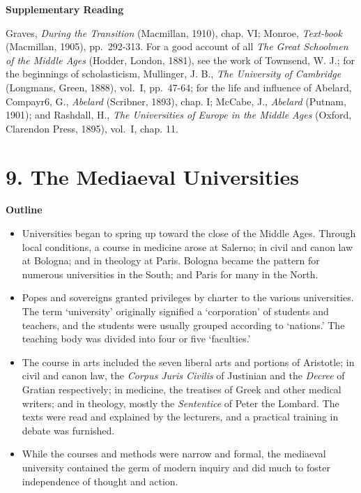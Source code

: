 \documentclass[]{book}
\providecommand{\tightlist}{%
  \setlength{\itemsep}{0pt}\setlength{\parskip}{0pt}}
\begin{document}
\textbf{Supplementary Reading}

Graves, \emph{During the Transition} (Macmillan, 1910), chap. VI; Monroe, \emph{Text-book} (Macmillan, 1905), pp.~292-313. For a good account of all \emph{The Great Schoolmen of the Middle Ages} (Hodder, London, 1881), see the work of Townsend, W. J.; for the beginnings of scholasticism, Mullinger, J. B., \emph{The University of Cambridge} (Longmans, Green, 1888), vol.~I, pp.~47-64; for the life and influence of Abelard, Compayr6, G., \emph{Abelard} (Scribner, 1893), chap. I; McCabe, J., \emph{Abelard} (Putnam, 1901); and Rashdall, H., \emph{The Universities of Europe in the Middle Ages} (Oxford, Clarendon Press, 1895), vol.~I, chap. 11.

\hypertarget{the-mediaeval-universities}{%
\chapter{9. The Mediaeval Universities}\label{the-mediaeval-universities}}

\textbf{Outline}

\begin{itemize}
\tightlist
\item
  Universities began to spring up toward the close of the Middle Ages. Through local conditions, a course in medicine arose at Salerno; in civil and canon law at Bologna; and in theology at Paris. Bologna became the pattern for numerous universities in the South; and Paris for many in the North.
\item
  Popes and sovereigns granted privileges by charter to the various universities. The term `university' originally signified a `corporation' of students and teachers, and the students were usually grouped according to `nations.' The teaching body was divided into four or five `faculties.'
\item
  The course in arts included the seven liberal arts and portions of Aristotle; in civil and canon law, the \emph{Corpus Juris Civilis} of Justinian and the \emph{Decree} of Gratian respectively; in medicine, the treatises of Greek and other medical writers; and in theology, mostly the \emph{Sententice} of Peter the Lombard. The texts were read and explained by the lecturers, and a practical training in debate was furnished.
\item
  While the courses and methods were narrow and formal, the mediaeval university contained the germ of modern inquiry and did much to foster independence of thought and action.
\end{itemize}
\end{document}
